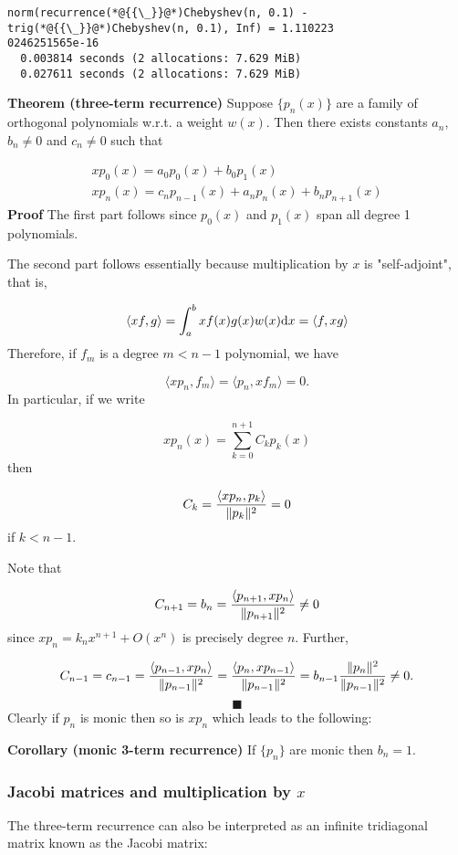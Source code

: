 \documentclass[12pt,landscape]{article}
\begin{document}
{\begin{lstlisting}
norm(recurrence(*@{{\_}}@*)Chebyshev(n, 0.1) - trig(*@{{\_}}@*)Chebyshev(n, 0.1), Inf) = 1.110223
0246251565e-16
  0.003814 seconds (2 allocations: 7.629 MiB)
  0.027611 seconds (2 allocations: 7.629 MiB)
\end{lstlisting}


\textbf{Theorem (three-term recurrence)} Suppose $\{p_n(x)\}$ are a family of orthogonal polynomials w.r.t. a weight $w(x)$. Then there exists constants $a_n$, $b_n \neq 0$ and $c_n \neq 0$ such that


\begin{align*}
x p_0(x) = a_0 p_0(x) + b_0 p_1(x) \\
x p_n(x) = c_n p_{n-1}(x) + a_n p_n(x) + b_n p_{n+1}(x)
\end{align*}
\textbf{Proof} The first part follows since $p_0(x)$ and $p_1(x)$ span all degree 1 polynomials.

The second part follows essentially because multiplication by $x$ is "self-adjoint", that is,

\[
\langle x f, g\rangle = \int_a^b x f(x) g(x) w(x) {\rm d}x = \langle f, x g \rangle
\]
Therefore, if $f_m$ is a degree $m < n-1$ polynomial, we have

\[
\langle x p_n, f_m\rangle = \langle p_n, x f_m\rangle = 0.
\]
In particular, if we write

\[
x p_n(x) = \sum_{k=0}^{n+1} C_k p_k(x)
\]
then

\[
C_k = {\langle x p_n, p_k\rangle \over \| p_k\|^2} = 0
\]
if $k < n-1$.

Note that

\[
C_{n+1} = b_n = {\ensuremath{\langle}p_{n+1}, x p_n\ensuremath{\rangle} \over \|p_{n+1} \|^2} \ensuremath{\ne} 0
\]
since $x p_n = k_n x^{n+1} + O(x^n)$ is precisely degree $n$. Further,

\[
C_{n-1} = c_{n-1} = {\ensuremath{\langle}p_{n-1}, x p_n\ensuremath{\rangle} \over \|p_{n-1}\|^2 } =
{\ensuremath{\langle}p_n, x p_{n-1}\ensuremath{\rangle}  \over \|p_{n-1}\|^2 } =  b_{n-1}{\|p_n\|^2  \over \|p_{n-1}\|^2 } \ensuremath{\ne} 0.
\]
\[
\blacksquare
\]
Clearly if $p_n$ is monic then so is $x p_n$ which leads to the following:

\textbf{Corollary (monic 3-term recurrence)} If $\{p_n\}$ are monic then $b_n =  1$.

\subsubsection{Jacobi matrices and multiplication by $x$}
The three-term recurrence can also be interpreted as an infinite tridiagonal matrix known as the Jacobi matrix:

}
\end{document}
